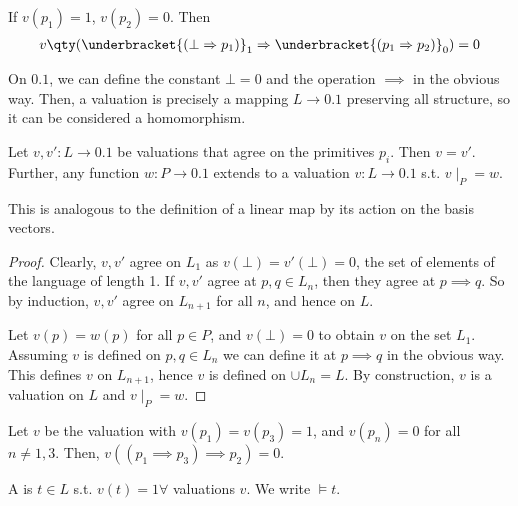 \begin{example}
    If $v(p_1) = 1$, $v(p_2) = 0$.
    Then \begin{align*}
        v\qty( \underbracket{(\bot \implies p_1)}_{1} \implies \underbracket{(p_1 \implies p_2)}_{0}) = 0
    \end{align*}
\end{example}

\begin{remark}
    On $\qty{0,1}$, we can define the constant $\bot = 0$ and the operation $\implies$ in the obvious way.
    Then, a valuation is precisely a mapping $L \to \qty{0,1}$ preserving all structure, so it can be considered a homomorphism.
\end{remark}

\begin{proposition}
    Let $v, v' \colon L \to \qty{0,1}$ be valuations that agree on the primitives $p_i$.
    Then $v = v'$.
    Further, any function $w \colon P \to \qty{0,1}$ extends to a valuation $v : L \to \qty{0, 1}$ s.t. $v\mid_P = w$.
\end{proposition}

\begin{remark}
    This is analogous to the definition of a linear map by its action on the basis vectors.
\end{remark}

\begin{proof}
    Clearly, $v, v'$ agree on $L_1$ as $v(\bot) = v'(\bot) = 0$, the set of elements of the language of length 1.
    If $v, v'$ agree at $p, q \in L_n$, then they agree at $p \implies q$.
    So by induction, $v, v'$ agree on $L_{n+1}$ for all $n$, and hence on $L$.

    Let $v(p) = w(p)$ for all $p \in P$, and $v(\bot) = 0$ to obtain $v$ on the set $L_1$.
    Assuming $v$ is defined on $p, q \in L_n$ we can define it at $p \implies q$ in the obvious way.
    This defines $v$ on $L_{n+1}$, hence $v$ is defined on $\cup L_n = L$.
    By construction, $v$ is a valuation on $L$ and $v \mid_P = w$.
\end{proof}

\begin{example}
    Let $v$ be the valuation with $v(p_1) = v(p_3) = 1$, and $v(p_n) = 0$ for all $n \neq 1, 3$.
    Then, $v((p_1 \implies p_3) \implies p_2) = 0$.
\end{example}

\begin{definition}[tautology]
    A  is $t \in L$ s.t. $v(t) = 1 \forall$ valuations $v$.
    We write $\models t$.
\end{definition}

